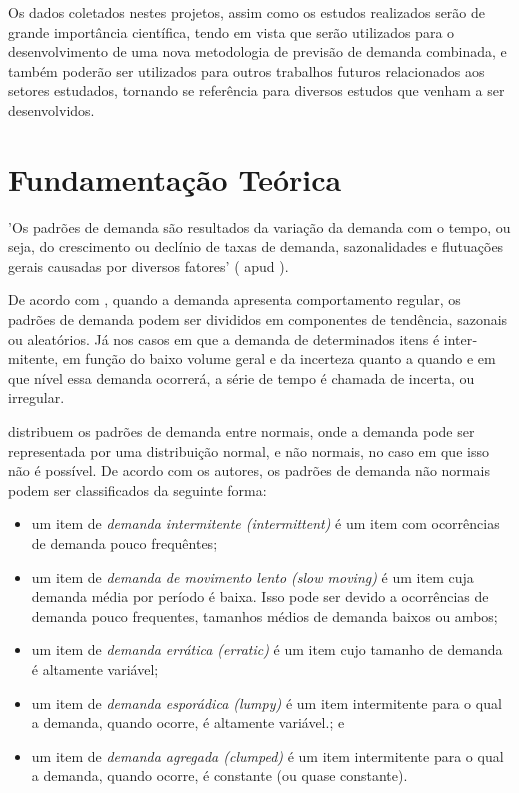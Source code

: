 \documentclass[11pt,letterpaper,twocolumn]{article}
\begin{document}
Os dados coletados nestes projetos, assim como os estudos realizados serão de grande importância científica, tendo em vista que serão utilizados para o desenvolvimento de uma nova metodologia de previsão de demanda combinada, e também poderão ser utilizados para outros trabalhos futuros relacionados aos setores estudados, tornando se referência para diversos estudos que venham a ser desenvolvidos.

\section{Fundamentação Teórica}

'Os padrões de demanda são resultados da variação da demanda com o tempo, ou seja, do crescimento ou declínio de taxas de demanda, sazonalidades e flutuações gerais causadas por diversos fatores' (\cite{Ballou2001} apud \cite{WernerEtAl2006}). 

De acordo com \cite{Ballou2006}, quando a demanda apresenta comportamento regular, os padrões de demanda podem ser divididos em compo­nentes de tendência, sazonais ou aleatórios. Já nos casos em que a demanda de determinados itens é inter­mitente, em função do baixo volume geral e da incerte­za quanto a quando e em que nível essa demanda ocor­rerá, a série de tempo é chamada de incerta, ou irregu­lar.

\cite{BoylanEtAl2008} distribuem os padrões de demanda entre normais, onde a demanda pode ser representada por uma distribuição normal, e não normais, no caso em que isso não é possível. De acordo com os autores, os padrões de demanda não normais podem ser classificados da seguinte forma:

\begin{itemize}
  \item um item de \emph{demanda intermitente (intermittent)} é um item com ocorrências de demanda pouco frequêntes;
  \item um item de \emph{demanda de movimento lento (slow moving)} é um item cuja demanda média por período é baixa. Isso pode ser devido a ocorrências de demanda pouco frequentes, tamanhos médios de demanda baixos ou ambos;
  \item um item de \emph{demanda errática (erratic)} é um item cujo tamanho de demanda é altamente variável;
  \item um item de \emph{demanda esporádica (lumpy)} é um item intermitente para o qual a demanda, quando ocorre, é altamente variável.; e
  \item um item de \emph{demanda agregada (clumped)} é um item intermitente para o qual a demanda, quando ocorre, é constante (ou quase constante).
\end{itemize}
\end{document}
